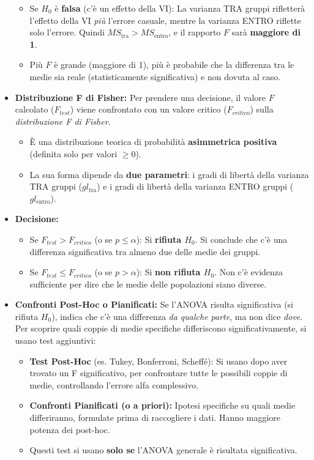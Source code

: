 \documentclass[12pt, a4paper]{article}
\newcommand{\Fscore}{F} %
\newcommand{\alphaerr}{\alpha} %
\newcommand{\Hnull}{H_0} %
\newcommand{\df}{gl} %
\newcommand{\MSb}{MS_{\text{tra}}} %
\newcommand{\MSw}{MS_{\text{entro}}} %
\newcommand{\dfb}{\df_{\text{tra}}} %
\newcommand{\dfw}{\df_{\text{entro}}} %
\begin{document}
\begin{itemize}
\begin{itemize}
            \item Se $\Hnull$ è \textbf{falsa} (c'è un effetto della VI): La varianza TRA gruppi rifletterà l'effetto della VI \textit{più} l'errore casuale, mentre la varianza ENTRO riflette solo l'errore. Quindi $\MSb > \MSw$, e il rapporto $\Fscore$ sarà \textbf{maggiore di 1}.
            \item Più $\Fscore$ è grande (maggiore di 1), più è probabile che la differenza tra le medie sia reale (statisticamente significativa) e non dovuta al caso.
        \end{itemize}
    \item \textbf{Distribuzione F di Fisher:} Per prendere una decisione, il valore $\Fscore$ calcolato ($\Fscore_{test}$) viene confrontato con un valore critico ($\Fscore_{critico}$) sulla \textit{distribuzione F di Fisher}.
        \begin{itemize}
            \item È una distribuzione teorica di probabilità \textbf{asimmetrica positiva} (definita solo per valori $\ge 0$).
            \item La sua forma dipende da \textbf{due parametri}: i gradi di libertà della varianza TRA gruppi ($\dfb$) e i gradi di libertà della varianza ENTRO gruppi ($\dfw$).
        \end{itemize}
    \item \textbf{Decisione:}
        \begin{itemize}
            \item Se $\Fscore_{test} > \Fscore_{critico}$ (o se $p \le \alphaerr$): Si \textbf{rifiuta $\Hnull$}. Si conclude che c'è una differenza significativa tra almeno due delle medie dei gruppi.
            \item Se $\Fscore_{test} \le \Fscore_{critico}$ (o se $p > \alphaerr$): Si \textbf{non rifiuta $\Hnull$}. Non c'è evidenza sufficiente per dire che le medie delle popolazioni siano diverse.
        \end{itemize}
    \item \textbf{Confronti Post-Hoc o Pianificati:} Se l'ANOVA risulta significativa (si rifiuta $\Hnull$), indica che c'è una differenza \textit{da qualche parte}, ma non dice \textit{dove}. Per scoprire quali coppie di medie specifiche differiscono significativamente, si usano test aggiuntivi:
        \begin{itemize}
            \item \textbf{Test Post-Hoc} (es. Tukey, Bonferroni, Scheffé): Si usano dopo aver trovato un F significativo, per confrontare tutte le possibili coppie di medie, controllando l'errore alfa complessivo.
            \item \textbf{Confronti Pianificati (o a priori):} Ipotesi specifiche su quali medie differiranno, formulate prima di raccogliere i dati. Hanno maggiore potenza dei post-hoc.
            \item Questi test si usano \textbf{solo se} l'ANOVA generale è risultata significativa.
        \end{itemize}
\end{itemize}
\end{document}
